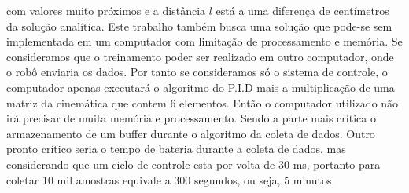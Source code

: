 com valores muito próximos e a distância $l$ está a uma diferença de
centímetros da solução analítica. Este trabalho também busca uma solução
que pode-se sem implementada em um computador com limitação de
processamento e memória. Se consideramos que o treinamento poder ser
realizado em outro computador, onde o robô enviaria os dados.
Por tanto se consideramos só o sistema de controle, o computador apenas
executará o algoritmo do  P.I.D mais a multiplicação de uma matriz da
cinemática que contem 6 elementos. Então o computador utilizado não irá
precisar de muita memória e processamento.
Sendo a parte mais crítica o armazenamento de um buffer durante o algoritmo
da coleta de dados. Outro pronto crítico seria o tempo de bateria durante
a coleta de dados, mas considerando que um ciclo de controle esta por volta
de 30 ms, portanto para coletar 10 mil amostras equivale a 300 segundos, ou
seja, 5 minutos.